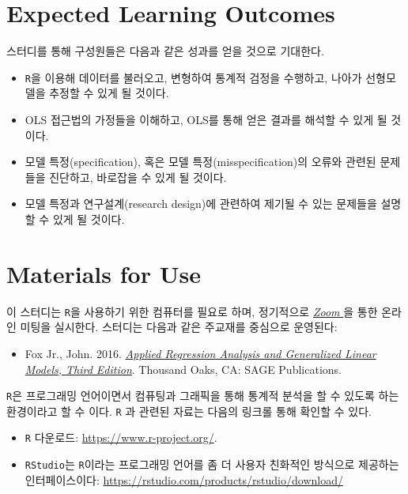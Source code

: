 \documentclass[11pt,]{article}
\providecommand{\tightlist}{%
  \setlength{\itemsep}{0pt}\setlength{\parskip}{0pt}}
\begin{document}
\hypertarget{expected-learning-outcomes}{%
\section{Expected Learning Outcomes}\label{expected-learning-outcomes}}

스터디를 통해 구성원들은 다음과 같은 성과를 얻을 것으로 기대한다.

\begin{itemize}
\item
  \texttt{R}을 이용해 데이터를 불러오고, 변형하여 통계적 검정을
  수행하고, 나아가 선형모델을 추정할 수 있게 될 것이다.
\item
  OLS 접근법의 가정들을 이해하고, OLS를 통해 얻은 결과를 해석할 수 있게
  될 것이다.
\item
  모델 특정(specification), 혹은 모델 특정(misspecification)의 오류와
  관련된 문제들을 진단하고, 바로잡을 수 있게 될 것이다.
\item
  모델 특정과 연구설계(research design)에 관련하여 제기될 수 있는
  문제들을 설명할 수 있게 될 것이다.
\end{itemize}

\hypertarget{materials-for-use}{%
\section{Materials for Use}\label{materials-for-use}}

이 스터디는 \texttt{R}을 사용하기 위한 컴퓨터를 필요로 하며, 정기적으로
\href{https://us02web.zoom.us/j/9013379527?pwd=akhTd0poRnNudUt5OGovejlWcW91QT09}{\emph{Zoom
}}을 통한 온라인 미팅을 실시한다. 스터디는 다음과 같은 주교재를 중심으로
운영된다:

\begin{itemize}
\tightlist
\item
  Fox Jr., John. 2016.
  \href{https://www.dropbox.com/s/x4h76g5j3657m3w/John\%20Fox\%20-\%20Applied\%20Regression\%20Analysis\%20and\%20Generalized\%20Linear\%20Models.pdf?dl=0}{\emph{Applied
  Regression Analysis and Generalized Linear Models, Third Edition}}.
  Thousand Oaks, CA: SAGE Publications.
\end{itemize}

\texttt{R}은 프로그래밍 언어이면서 컴퓨팅과 그래픽을 통해 통계적 분석을
할 수 있도록 하는 환경이라고 할 수 이다. \texttt{R} 과 관련된 자료는
다음의 링크롤 통해 확인할 수 있다.

\begin{itemize}
\item
  \texttt{R} 다운로드: \url{https://www.r-project.org/}.
\item
  \texttt{RStudio}는 \texttt{R}이라는 프로그래밍 언어를 좀 더 사용자
  친화적인 방식으로 제공하는 인터페이스이다:
  \url{https://rstudio.com/products/rstudio/download/}
\end{itemize}
\end{document}
